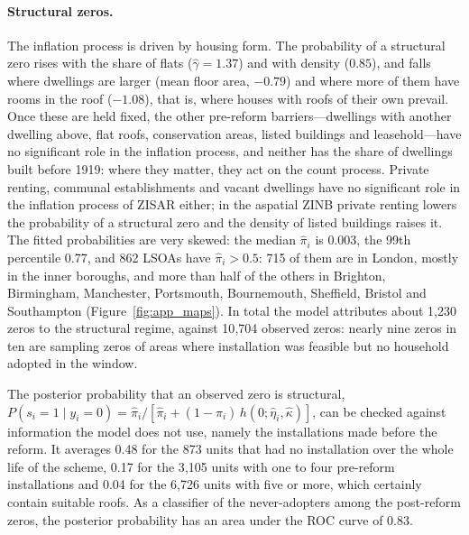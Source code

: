 \paragraph{Structural zeros.}
The inflation process is driven by housing form.
The probability of a structural zero rises with the share of flats ($\hat\gamma = 1.37$) and with density ($0.85$), and falls where dwellings are larger (mean floor area, $-0.79$) and where more of them have rooms in the roof ($-1.08$), that is, where houses with roofs of their own prevail.
Once these are held fixed, the other pre-reform barriers---dwellings with another dwelling above, flat roofs, conservation areas, listed buildings and leasehold---have no significant role in the inflation process, and neither has the share of dwellings built before 1919: where they matter, they act on the count process.
Private renting, communal establishments and vacant dwellings have no significant role in the inflation process of ZISAR either; in the aspatial ZINB private renting lowers the probability of a structural zero and the density of listed buildings raises it.
The fitted probabilities are very skewed: the median $\hat\pi_i$ is 0.003, the 99th percentile 0.77, and 862 LSOAs have $\hat\pi_i > 0.5$: 715 of them are in London, mostly in the inner boroughs, and more than half of the others in Brighton, Birmingham, Manchester, Portsmouth, Bournemouth, Sheffield, Bristol and Southampton (Figure~\ref{fig:app_maps}).
In total the model attributes about 1{,}230 zeros to the structural regime, against 10{,}704 observed zeros: nearly nine zeros in ten are sampling zeros of areas where installation was feasible but no household adopted in the window.

The posterior probability that an observed zero is structural, $P(s_i = 1\mid y_i=0) = \hat\pi_i/[\hat\pi_i + (1-\hat\pi_i)\,h(0;\hat\eta_i,\hat\kappa)]$, can be checked against information the model does not use, namely the installations made before the reform.
It averages 0.48 for the 873 units that had no installation over the whole life of the scheme, 0.17 for the 3{,}105 units with one to four pre-reform installations and 0.04 for the 6{,}726 units with five or more, which certainly contain suitable roofs.
As a classifier of the never-adopters among the post-reform zeros, the posterior probability has an area under the ROC curve of 0.83.

